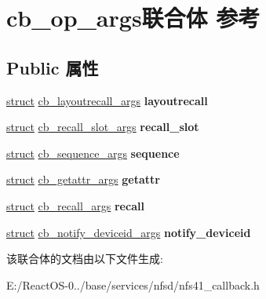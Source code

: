 \hypertarget{unioncb__op__args}{}\section{cb\+\_\+op\+\_\+args联合体 参考}
\label{unioncb__op__args}
\subsection*{Public 属性}
\begin{DoxyCompactItemize}
\item 
\mbox{\label{unioncb__op__args_af69ce0271799d71c12bd898fbfb63c10}} 
\hyperlink{interfacestruct}{struct} \hyperlink{structcb__layoutrecall__args}{cb\+\_\+layoutrecall\+\_\+args} {\bfseries layoutrecall}
\item 
\mbox{\label{unioncb__op__args_ae7ea55ad3c79b65f156cf1598c63c388}} 
\hyperlink{interfacestruct}{struct} \hyperlink{structcb__recall__slot__args}{cb\+\_\+recall\+\_\+slot\+\_\+args} {\bfseries recall\+\_\+slot}
\item 
\mbox{\label{unioncb__op__args_a62b19887bd9b8c33985920dc7869efa1}} 
\hyperlink{interfacestruct}{struct} \hyperlink{structcb__sequence__args}{cb\+\_\+sequence\+\_\+args} {\bfseries sequence}
\item 
\mbox{\label{unioncb__op__args_ac0b849bb28a4b5ef634051d7710f130b}} 
\hyperlink{interfacestruct}{struct} \hyperlink{structcb__getattr__args}{cb\+\_\+getattr\+\_\+args} {\bfseries getattr}
\item 
\mbox{\label{unioncb__op__args_a12c9860bbf923d3756555cf7b3997a77}} 
\hyperlink{interfacestruct}{struct} \hyperlink{structcb__recall__args}{cb\+\_\+recall\+\_\+args} {\bfseries recall}
\item 
\mbox{\label{unioncb__op__args_af266b7857cad479d394216055fa97679}} 
\hyperlink{interfacestruct}{struct} \hyperlink{structcb__notify__deviceid__args}{cb\+\_\+notify\+\_\+deviceid\+\_\+args} {\bfseries notify\+\_\+deviceid}
\end{DoxyCompactItemize}


该联合体的文档由以下文件生成\+:\begin{DoxyCompactItemize}
\item 
E\+:/\+React\+O\+S-\/0../base/services/nfsd/nfs41\+\_\+callback.\+h\end{DoxyCompactItemize}
